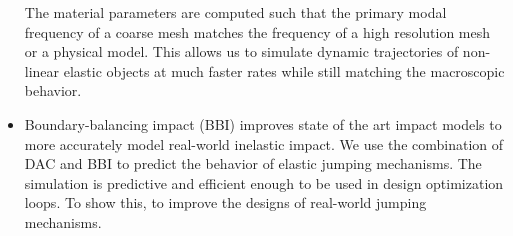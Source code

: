\begin{itemize}
	The material parameters are computed such that the primary modal frequency
	of a coarse mesh matches the frequency of a high resolution mesh or a physical model.
	This allows us to simulate dynamic trajectories of non-linear elastic objects at much faster rates while still matching the macroscopic behavior.
	\item Boundary-balancing impact (BBI) improves state of the art impact models to more accurately model real-world inelastic impact.
	We use the combination of DAC and BBI to predict the behavior of elastic jumping mechanisms.
	The simulation is predictive and efficient enough to be used in design optimization loops.
	To show this, to improve the designs of real-world jumping mechanisms.
\end{itemize}